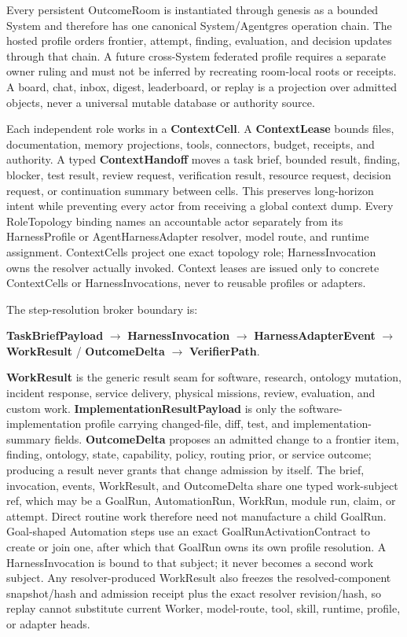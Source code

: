 \documentclass[
  11pt,
]{article}
\begin{document}
Every persistent OutcomeRoom is instantiated through genesis as a bounded
System and therefore has one canonical System/Agentgres operation chain. The
hosted profile orders frontier, attempt, finding, evaluation, and decision
updates through that chain. A future cross-System federated profile requires a
separate owner ruling and must not be inferred by recreating room-local roots
or receipts. A board, chat, inbox, digest, leaderboard, or replay is a
projection over admitted objects, never a universal mutable database or
authority source.

Each independent role works in a \textbf{ContextCell}. A
\textbf{ContextLease} bounds files, documentation, memory projections,
tools, connectors, budget, receipts, and authority. A typed
\textbf{ContextHandoff} moves a task brief, bounded result, finding, blocker,
test result, review request, verification result, resource request, decision
request, or continuation summary between cells. This preserves long-horizon
intent while preventing every actor from receiving a global context dump.
Every RoleTopology binding names an accountable actor separately from its
HarnessProfile or AgentHarnessAdapter resolver, model route, and runtime
assignment. ContextCells project one exact topology role; HarnessInvocation
owns the resolver actually invoked. Context leases are issued only to concrete
ContextCells or HarnessInvocations, never to reusable profiles or adapters.

The step-resolution broker boundary is:

\begin{center}
\textbf{TaskBriefPayload} $\rightarrow$ \textbf{HarnessInvocation}
$\rightarrow$ \textbf{HarnessAdapterEvent} $\rightarrow$
\textbf{WorkResult} / \textbf{OutcomeDelta} $\rightarrow$
\textbf{VerifierPath}.
\end{center}

\textbf{WorkResult} is the generic result seam for software, research,
ontology mutation, incident response, service delivery, physical missions,
review, evaluation, and custom work. \textbf{ImplementationResultPayload} is
only the software-implementation profile carrying changed-file, diff, test,
and implementation-summary fields. \textbf{OutcomeDelta} proposes an admitted
change to a frontier item, finding, ontology, state, capability, policy,
routing prior, or service outcome; producing a result never grants that change
admission by itself.
The brief, invocation, events, WorkResult, and OutcomeDelta share one typed
work-subject ref, which may be a GoalRun, AutomationRun, WorkRun, module run,
claim, or attempt. Direct routine work therefore need not manufacture a child
GoalRun. Goal-shaped Automation steps use an exact GoalRunActivationContract to
create or join one, after which that GoalRun owns its own profile resolution.
A HarnessInvocation is bound to that subject; it never becomes a second work
subject. Any resolver-produced WorkResult also freezes the resolved-component
snapshot/hash and admission receipt plus the exact resolver revision/hash, so
replay cannot substitute current Worker, model-route, tool, skill, runtime,
profile, or adapter heads.
\end{document}
